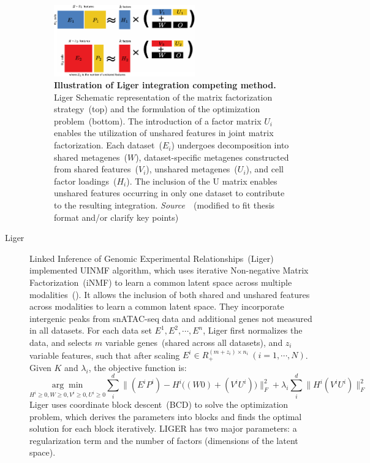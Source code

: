 \begin{description}
 \begin{figure}[!h]
  	\centering
  	\includegraphics[width=0.6\textwidth]{Alg_Liger/fig}
  	\vspace{0.1cm}
  	\caption[Illustration of Liger integration competing method.]{\textbf{Illustration of Liger integration competing method.} Liger Schematic representation of the matrix factorization strategy~(top) and the formulation of the optimization problem~(bottom). The introduction of a factor matrix $U_i$ enables the utilization of unshared features in joint matrix factorization. Each dataset~($E_i$) undergoes decomposition into shared metagenes~($W$), dataset-specific metagenes constructed from shared features~($V_i$), unshared metagenes~($U_i$), and cell factor loadings~($H_i$). The inclusion of the U matrix enables unshared features occurring in only one dataset to contribute to the resulting integration. \emph{Source~\cite{kriebel2022uinmf}}~(modified to fit thesis format and/or clarify key points)
  }
  	\label{fig:Alg_Liger}
 \end{figure}

  \item[Liger]
  Linked Inference of Genomic Experimental Relationships~(Liger)~\citep{kriebel2022uinmf} implemented UINMF algorithm, which uses iterative Non-negative Matrix Factorization~(iNMF) to learn a common latent space across multiple modalities~(). It allows the inclusion of both shared and unshared features across modalities to learn a common latent space. They incorporate intergenic peaks from snATAC-seq data and additional genes not measured in all datasets. For each data set $E^1, E^2, \cdots, E^n$, Liger first normalizes the data, and selects $m$ variable genes~(shared across all datasets), and $z_i$ variable features, such that after scaling $E^i \in R_{+}^{(m+z_i)\times n_i}\ (i=1,\cdots,N)$. Given $K$ and $\lambda_i$, the objective function is:
  \begin{equation}
	  \underset{H^i\geq 0,W\geq 0, V^i\geq 0, U^i \geq 0}{\arg\min} \sum_i^{d}\Big\| (E^i P^i) - H^i \big((W 0) + (V^i U^i)\big)\Big\|_{F}^2 + \lambda_i\sum_i^d\Big\|H^i(V^i U^i)\Big\|_{F}^2
  \end{equation}
  Liger uses coordinate block descent~(BCD) to solve the optimization problem, which derives the parameters into blocks and finds the optimal solution for each block iteratively. LIGER has two major parameters: a regularization term and the number of factors (dimensions of the latent space).



\end{description}
